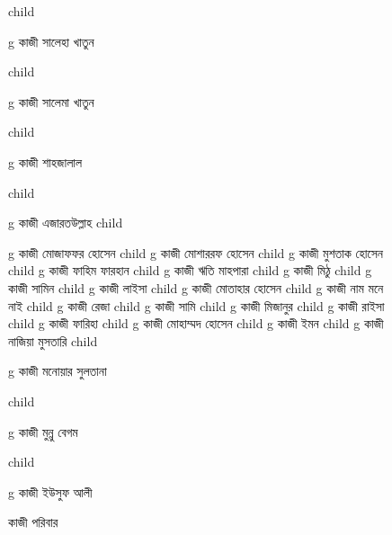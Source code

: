 \documentclass{article}
\begin{document}
\begin{figure}
{\begin{genealogypicture}
{{{{%
        }%
        child{
          g{ কাজী সালেহা খাতুন }

        }%
        child{
          g{ কাজী সালেমা খাতুন }

        }%
        child{
          g{ কাজী শাহজালাল }

        }
      }
        child{
        g{ কাজী এজারতউল্লাহ  }
          child{    g{ কাজী মোজাফফর হোসেন }
              child{
                g{ কাজী মোশাররফ হোসেন }
                  child{    g{ কাজী মুশতাক হোসেন }
                    child{    g{ কাজী ফাহিম ফারহান }   }
                    child{    g{ কাজী ঋতি মাহপারা }   }
                  }
                  child{    g{ কাজী মিঠু }
                    child{    g{ কাজী সামিন  }   }
                    child{    g{ কাজী লাইসা }   }
                  }
              }
              child{
              g{ কাজী মোতাহার হোসেন  }
              child{    g{ কাজী নাম মনে নাই  }   }
              child{    g{ কাজী রেজা } 
                  child{    g{ কাজী সামি }   }
              }
              child{    g{ কাজী মিজানুর }  
                  child{    g{ কাজী রাইসা }   }
                  child{    g{ কাজী ফারিহা }   }
              }
            }
            child{
              g{ কাজী মোহাম্মদ হোসেন }
              child{    g{ কাজী ইমন  }   }
              child{    g{ কাজী নাজিয়া মুসতারি }   }
            }
            child{
              g{ কাজী মনোয়ার সুলতানা }

            }%
            child{
              g{ কাজী মুন্নু বেগম }

            }

          }       
        }
      }
      child{
        g{ কাজী ইউসুফ আলী }

      }
    }
    \end{genealogypicture}
    }
    \begin{comment}
      child{
        g{ কাজী }

      }
      \end{comment}
    \caption{কাজী পরিবার}
    \end{figure}
    
\end{document}
